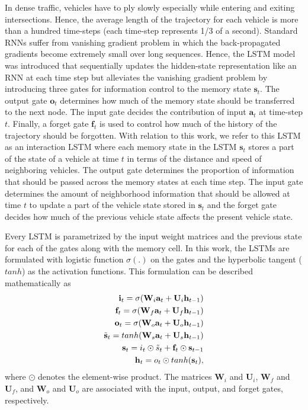 \documentclass[final,journal]{IEEEtran}
\begin{document}
In dense traffic, vehicles have to ply slowly especially while entering and exiting intersections. Hence, the average length of the trajectory for each vehicle is more than a hundred time-steps (each time-step represents 1/3 of a second). Standard RNNs suffer from vanishing gradient problem in which the back-propagated gradients become extremely small over long sequences. Hence, the LSTM model was introduced \cite{lstm} that sequentially updates the hidden-state representation like an RNN at each time step but alleviates the vanishing gradient problem by introducing three gates for information control to the memory state $\mathbf{s}_t$. The output gate $\mathbf{o}_t$ determines how much of the memory state should be transferred to the next node. The input gate decides the contribution of input $\mathbf{a}_t$ at time-step $t$. Finally, a forget gate $\textbf{f}_t$ is used to control how much of the history of the trajectory should be forgotten. With relation to this work, we refer to this LSTM as an interaction LSTM where each memory state in the LSTM $\textbf{s}_t$ stores a part of the state of a vehicle at time $t$ in terms of the distance and speed of neighboring vehicles. The output gate determines the proportion of information that should be passed across the memory states at each time step. The input gate determines the amount of neighborhood information that should be allowed at time $t$ to update a part of the vehicle state stored in $\textbf{s}_t$ and the forget gate decides how much of the previous vehicle state affects the present vehicle state. 

Every LSTM is parametrized by the input weight matrices and the previous state for each of the gates along with the memory cell. In this work, the LSTMs are formulated with logistic function $\sigma(.)$ on the gates and the hyperbolic tangent ($tanh$) as the activation functions. This formulation can be described mathematically as  
\begin{equation}
\begin{split}
\mathbf{i}_t = \sigma(\mathbf{W}_i \mathbf{a}_t + \mathbf{U}_i \mathbf{h}_{t-1}) \\ 
\mathbf{f}_t = \sigma(\mathbf{W}_f \mathbf{a}_t + \mathbf{U}_f \mathbf{h}_{t-1})  \\
\mathbf{o}_t = \sigma(\mathbf{W}_o \mathbf{a}_t + \mathbf{U}_o \mathbf{h}_{t-1}) \\
\Tilde{\mathbf{s}}_t = tanh(\mathbf{W}_s \mathbf{a}_t + \mathbf{U}_s \mathbf{h}_{t-1}) \\
\mathbf{s}_t = i_t \odot \Tilde{s}_t + \mathbf{f}_t \odot \mathbf{s}_{t-1} \\
\mathbf{h}_t = o_t \odot tanh(\mathbf{s}_t),
\end{split}
\end{equation}
where $\odot$ denotes the element-wise product. The matrices $\mathbf{W}_i$ and $\mathbf{U}_i$, $\mathbf{W}_f$ and $\mathbf{U}_f$, and $\mathbf{W}_o$ and $\mathbf{U}_o$ are associated with the input, output, and forget gates, respectively.
\end{document}
